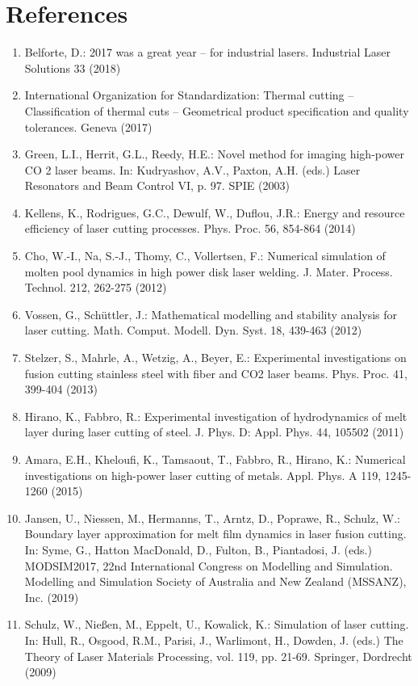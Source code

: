 \documentclass[10pt]{article}
\begin{document}
\section*{References}
\begin{enumerate}
  \item Belforte, D.: 2017 was a great year -- for industrial lasers. Industrial Laser Solutions 33 (2018)

  \item International Organization for Standardization: Thermal cutting -- Classification of thermal cuts -- Geometrical product specification and quality tolerances. Geneva (2017)

  \item Green, L.I., Herrit, G.L., Reedy, H.E.: Novel method for imaging high-power CO 2 laser beams. In: Kudryashov, A.V., Paxton, A.H. (eds.) Laser Resonators and Beam Control VI, p. 97. SPIE (2003)

  \item Kellens, K., Rodrigues, G.C., Dewulf, W., Duflou, J.R.: Energy and resource efficiency of laser cutting processes. Phys. Proc. 56, 854-864 (2014)

  \item Cho, W.-I., Na, S.-J., Thomy, C., Vollertsen, F.: Numerical simulation of molten pool dynamics in high power disk laser welding. J. Mater. Process. Technol. 212, 262-275 (2012)

  \item Vossen, G., Schüttler, J.: Mathematical modelling and stability analysis for laser cutting. Math. Comput. Modell. Dyn. Syst. 18, 439-463 (2012)

  \item Stelzer, S., Mahrle, A., Wetzig, A., Beyer, E.: Experimental investigations on fusion cutting stainless steel with fiber and CO2 laser beams. Phys. Proc. 41, 399-404 (2013)

  \item Hirano, K., Fabbro, R.: Experimental investigation of hydrodynamics of melt layer during laser cutting of steel. J. Phys. D: Appl. Phys. 44, 105502 (2011)

  \item Amara, E.H., Kheloufi, K., Tamsaout, T., Fabbro, R., Hirano, K.: Numerical investigations on high-power laser cutting of metals. Appl. Phys. A 119, 1245-1260 (2015)

  \item Jansen, U., Niessen, M., Hermanns, T., Arntz, D., Poprawe, R., Schulz, W.: Boundary layer approximation for melt film dynamics in laser fusion cutting. In: Syme, G., Hatton MacDonald, D., Fulton, B., Piantadosi, J. (eds.) MODSIM2017, 22nd International Congress on Modelling and Simulation. Modelling and Simulation Society of Australia and New Zealand (MSSANZ), Inc. (2019)

  \item Schulz, W., Nießen, M., Eppelt, U., Kowalick, K.: Simulation of laser cutting. In: Hull, R., Osgood, R.M., Parisi, J., Warlimont, H., Dowden, J. (eds.) The Theory of Laser Materials Processing, vol. 119, pp. 21-69. Springer, Dordrecht (2009)

\end{enumerate}
\end{document}
